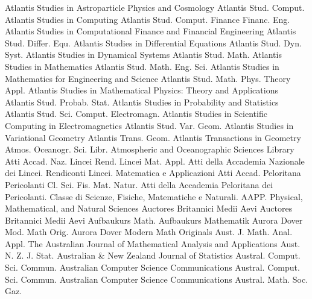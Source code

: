 {Atlantis Studies in Astroparticle Physics and Cosmology}
{Atlantis Stud. Comput.}
{Atlantis Studies in Computing}
{Atlantis Stud. Comput. Finance Financ. Eng.}
{Atlantis Studies in Computational Finance and Financial Engineering}
{Atlantis Stud. Differ. Equ.}
{Atlantis Studies in Differential Equations}
{Atlantis Stud. Dyn. Syst.}
{Atlantis Studies in Dynamical Systems}
{Atlantis Stud. Math.}
{Atlantis Studies in Mathematics}
{Atlantis Stud. Math. Eng. Sci.}
{Atlantis Studies in Mathematics for Engineering and Science}
{Atlantis Stud. Math. Phys. Theory Appl.}
{Atlantis Studies in Mathematical Physics: Theory and Applications}
{Atlantis Stud. Probab. Stat.}
{Atlantis Studies in Probability and Statistics}
{Atlantis Stud. Sci. Comput. Electromagn.}
{Atlantis Studies in Scientific Computing in Electromagnetics}
{Atlantis Stud. Var. Geom.}
{Atlantis Studies in Variational Geometry}
{Atlantis Trans. Geom.}
{Atlantis Transactions in Geometry}
{Atmos. Oceanogr. Sci. Libr.}
{Atmospheric and Oceanographic Sciences Library}
{Atti Accad. Naz. Lincei Rend. Lincei Mat. Appl.}
{Atti della Accademia Nazionale dei Lincei. Rendiconti Lincei. Matematica e Applicazioni}
{Atti Accad. Peloritana Pericolanti Cl. Sci. Fis. Mat. Natur.}
{Atti della Accademia Peloritana dei Pericolanti. Classe di Scienze, Fisiche, Matematiche e Naturali. AAPP. Physical, Mathematical, and Natural Sciences}
{Auctores Britannici Medii Aevi}
{Auctores Britannici Medii Aevi}
{Aufbaukurs Math.}
{Aufbaukurs Mathematik}
{Aurora Dover Mod. Math Orig.}
{Aurora Dover Modern Math Originals}
{Aust. J. Math. Anal. Appl.}
{The Australian Journal of Mathematical Analysis and Applications}
{Aust. N. Z. J. Stat.}
{Australian & New Zealand Journal of Statistics}
{Austral. Comput. Sci. Commun.}
{Australian Computer Science Communications}
{Austral. Comput. Sci. Commun.}
{Australian Computer Science Communications}
{Austral. Math. Soc. Gaz.}
